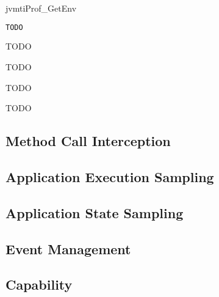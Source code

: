 \begin{apidef}{jvmtiProf_GetEnv}
\begin{lstlisting}[language=C]
TODO
\end{lstlisting}

\begin{apidesc}
TODO
\end{apidesc}

\begin{apiphase}
TODO
\end{apiphase}

\begin{apicap}
TODO
\end{apicap}

\begin{apiparam}
\end{apiparam}

\begin{apireturn}
TODO
\end{apireturn}

\begin{apierror}
\end{apierror}
\end{apidef}

\subsection{Method Call Interception}

\subsection{Application Execution Sampling}

\subsection{Application State Sampling}

\subsection{Event Management}

\subsection{Capability}

